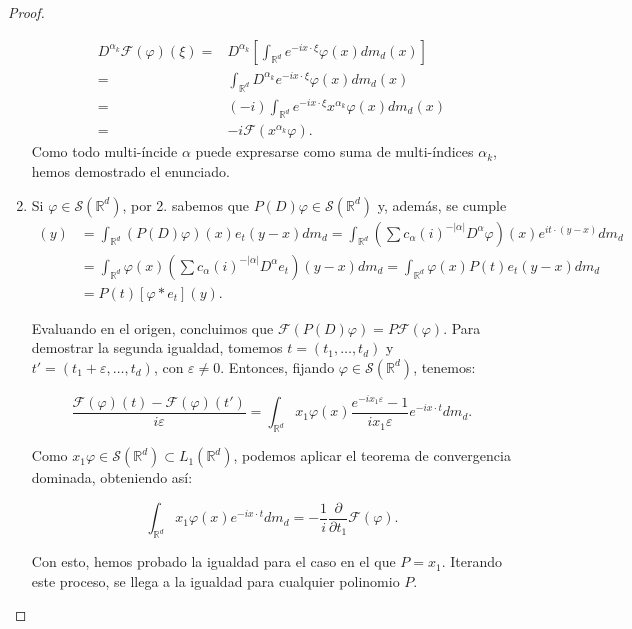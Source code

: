 \begin{proof}
\begin{enumerate}
\begin{align*}
D^{\alpha_{k}}\mathcal{F}(\varphi)(\xi) = & D^{\alpha_{k}} \left[ \int_{\mathds{R}^{d}} e^{-ix\cdot\xi} \varphi(x)dm_{d}(x)\right] \\
= & \int_{\mathds{R}^{d}} D^{\alpha_{k}} e^{-ix\cdot\xi} \varphi(x)dm_d(x) \\
= & (-i) \int_{\mathds{R}^{d}} e^{-ix\cdot\xi}x^{\alpha_k}\varphi(x)dm_d(x) \\
= & -i\mathcal{F}(x^{\alpha_k}\varphi).
\end{align*}
Como todo multi-íncide $\alpha$ puede expresarse como suma de multi-índices $\alpha_{k}$, hemos demostrado el enunciado. 
\item Si $\varphi\in\mathcal{S}(\mathds{R}^{d})$, por 2. sabemos que $P(D)\varphi\in \mathcal{S}(\mathds{R}^{d})$ y, además, se cumple 
\begin{align}
[(P(D)\varphi)*e_{t}](y) & = \int_{\mathds{R}^{d}} (P(D)\varphi)(x)e_{t}(y-x)dm_{d} = \int_{\mathds{R}^{d}} (\sum c_{\alpha} (i)^{-|\alpha |}D^{\alpha}\varphi)(x)e^{it\cdot (y-x)}dm_{d}\\  &= \int_{\mathds{R}^{d}} \varphi(x)(\sum c_{\alpha} (i)^{-|\alpha |}D^{\alpha}e_{t})(y-x)dm_{d} = 
\int_{\mathds{R}^{d}} \varphi(x)P(t)e_{t}(y-x)dm_{d} \\ & = P(t) [ \varphi*e_{t} ](y).
\end{align} 

Evaluando en el origen, concluimos que $\mathcal{F}(P(D)\varphi) = P \mathcal{F}(\varphi)$. Para demostrar la segunda igualdad, tomemos $t=(t_1,\ldots, t_d)$ y $t'=(t_1+\varepsilon,\ldots,t_d)$, con $\varepsilon\neq 0$. Entonces, fijando $\varphi\in \mathcal{S}(\mathds{R}^d)$, tenemos:

\begin{equation}
    \frac{\mathcal{F}(\varphi)(t)-\mathcal{F}(\varphi)(t')}{i\varepsilon} = \int_{\mathds{R}^d}x_1\varphi (x) \frac{e^{-ix_1\varepsilon}-1}{i x_1 \varepsilon}e^{-ix \cdot t}dm_d.
\end{equation}

Como $x_1 \varphi \in \mathcal{S}(\mathds{R}^d) \subset L_1(\mathds{R}^d)$, podemos aplicar el teorema de convergencia dominada, obteniendo así:

\begin{equation}
 \int_{\mathds{R}^d} x_1 \varphi (x) e^{-i x\cdot t }dm_d =     - \frac{1}{i} \frac{\partial}{\partial t_1} \mathcal{F}(\varphi).
\end{equation}

Con esto, hemos probado la igualdad para el caso en el que $P=x_1$. Iterando este proceso, se llega a la igualdad para cualquier polinomio $P$.


\end{enumerate}
\end{proof}
